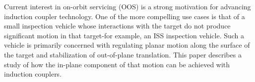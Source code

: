  
Current interest in on-orbit servicing (OOS) is a strong motivation for advancing induction coupler technology. \cite{Ambrose2012}
 One of the more compelling use cases is that of a small inspection vehicle whose interactions with the target do not produce significant motion in that target-for example, an ISS inspection vehicle. Such a vehicle is primarily concerned with regulating planar motion along the surface of the target and stabilization of out-of-plane translation. This paper describes a study of how the in-plane component of that motion can be achieved with induction couplers.


